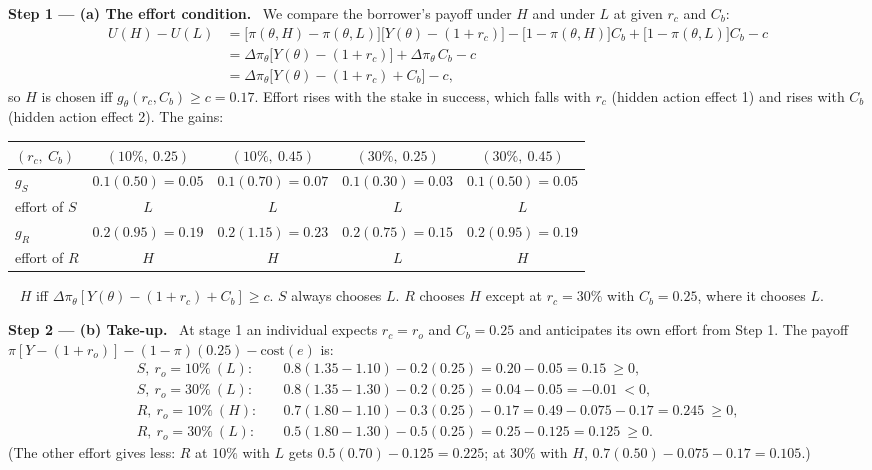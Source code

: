 \documentclass[11pt,a4paper]{article}
\newcommand{\step}[2]{\par\medskip\noindent\textbf{Step #1 --- #2.}~}
\newcommand{\answer}[1]{\par\smallskip\noindent\fbox{\textbf{Answer #1.}}~}
\begin{document}
\step{1}{(a) The effort condition} We compare the borrower's payoff under $H$ and under $L$ at given $r_c$ and $C_b$:
\begin{align}
  U(H)-U(L) &= \big[\pi(\theta,H)-\pi(\theta,L)\big]\big[Y(\theta)-(1+r_c)\big]
               -\big[1-\pi(\theta,H)\big]C_b+\big[1-\pi(\theta,L)\big]C_b - c \nonumber\\
            &= \Delta\pi_\theta\big[Y(\theta)-(1+r_c)\big] + \Delta\pi_\theta\,C_b - c \nonumber\\
            &= \Delta\pi_\theta\big[Y(\theta)-(1+r_c)+C_b\big] - c, \label{t4e18-ic}
\end{align}
so $H$ is chosen iff $g_\theta(r_c,C_b)\ge c=0.17$. Effort rises with the stake in success, which falls with
$r_c$ (hidden action effect 1) and rises with $C_b$ (hidden action effect 2). The gains:
\begin{center}
\begin{tabular}{lcccc}
\toprule
$(r_c,\ C_b)$ & $(10\%,\ 0.25)$ & $(10\%,\ 0.45)$ & $(30\%,\ 0.25)$ & $(30\%,\ 0.45)$\\
\midrule
$g_S$ & $0.1(0.50)=0.05$ & $0.1(0.70)=0.07$ & $0.1(0.30)=0.03$ & $0.1(0.50)=0.05$\\
effort of $S$ & $L$ & $L$ & $L$ & $L$\\
$g_R$ & $0.2(0.95)=0.19$ & $0.2(1.15)=0.23$ & $0.2(0.75)=0.15$ & $0.2(0.95)=0.19$\\
effort of $R$ & $H$ & $H$ & $L$ & $H$\\
\bottomrule
\end{tabular}
\end{center}

\answer{(a)} $H$ iff $\Delta\pi_\theta[Y(\theta)-(1+r_c)+C_b]\ge c$. $S$ always chooses $L$. $R$ chooses $H$
except at $r_c=30\%$ with $C_b=0.25$, where it chooses $L$.

\step{2}{(b) Take-up} At stage 1 an individual expects $r_c=r_o$ and $C_b=0.25$ and anticipates its own effort
from Step 1. The payoff $\pi[Y-(1+r_o)]-(1-\pi)(0.25)-\text{cost}(e)$ is:
\begin{align}
  S,\ r_o=10\%\ (L):&\quad 0.8(1.35-1.10)-0.2(0.25) = 0.20-0.05 = 0.15\ \ge 0, \nonumber\\
  S,\ r_o=30\%\ (L):&\quad 0.8(1.35-1.30)-0.2(0.25) = 0.04-0.05 = -0.01\ <0, \nonumber\\
  R,\ r_o=10\%\ (H):&\quad 0.7(1.80-1.10)-0.3(0.25)-0.17 = 0.49-0.075-0.17 = 0.245\ \ge 0, \nonumber\\
  R,\ r_o=30\%\ (L):&\quad 0.5(1.80-1.30)-0.5(0.25) = 0.25-0.125 = 0.125\ \ge 0. \nonumber
\end{align}
(The other effort gives less: $R$ at $10\%$ with $L$ gets $0.5(0.70)-0.125=0.225$; at $30\%$ with $H$,
$0.7(0.50)-0.075-0.17=0.105$.)
\end{document}
